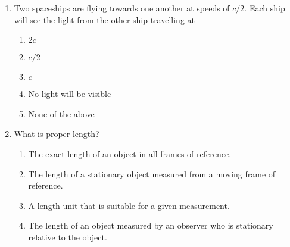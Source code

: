 \begin{enumerate}[itemsep=6pt]
\item Two spaceships are flying towards one another at speeds of $c/2$. Each
  ship will see the light from the other ship travelling at
  \begin{enumerate}
  \item $2c$
  \item $c/2$
  \item $c$    
  \item No light will be visible 
  \item None of the above
  \end{enumerate}
%
%
%
  
\item What is proper length?
  \begin{enumerate}
  \item The exact length of an object in all frames of reference.
  \item The length of a stationary object measured from a moving frame of
    reference.
  \item A length unit that is suitable for a given measurement.
  \item The length of an object measured by an observer who is stationary
    relative to the object.
  \end{enumerate}
  

\end{enumerate}
